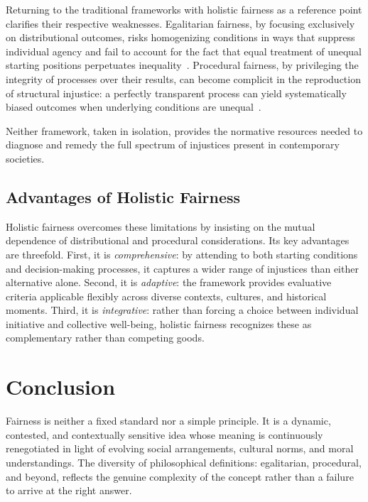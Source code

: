 \documentclass[11pt,showkeys]{essay}
\begin{document}
Returning to the traditional frameworks with holistic fairness as a reference point clarifies their respective weaknesses. Egalitarian fairness, by focusing exclusively on distributional outcomes, risks homogenizing conditions in ways that suppress individual agency and fail to account for the fact that equal treatment of unequal starting positions perpetuates inequality~\cite{temkin_equality_2019,afolayan_egalitarianism_2015}. Procedural fairness, by privileging the integrity of processes over their results, can become complicit in the reproduction of structural injustice: a perfectly transparent process can yield systematically biased outcomes when underlying conditions are unequal~\cite{macdonald_judicial_1980,galligan_procedural_1997}.

Neither framework, taken in isolation, provides the normative resources needed to diagnose and remedy the full spectrum of injustices present in contemporary societies.

\subsection{Advantages of Holistic Fairness}

Holistic fairness overcomes these limitations by insisting on the mutual dependence of distributional and procedural considerations. Its key advantages are threefold. First, it is \textit{comprehensive}: by attending to both starting conditions and decision-making processes, it captures a wider range of injustices than either alternative alone. Second, it is \textit{adaptive}: the framework provides evaluative criteria applicable flexibly across diverse contexts, cultures, and historical moments. Third, it is \textit{integrative}: rather than forcing a choice between individual initiative and collective well-being, holistic fairness recognizes these as complementary rather than competing goods.

\section{Conclusion}

Fairness is neither a fixed standard nor a simple principle. It is a dynamic, contested, and contextually sensitive idea whose meaning is continuously renegotiated in light of evolving social arrangements, cultural norms, and moral understandings. The diversity of philosophical definitions: egalitarian, procedural, and beyond, reflects the genuine complexity of the concept rather than a failure to arrive at the right answer.
\end{document}
